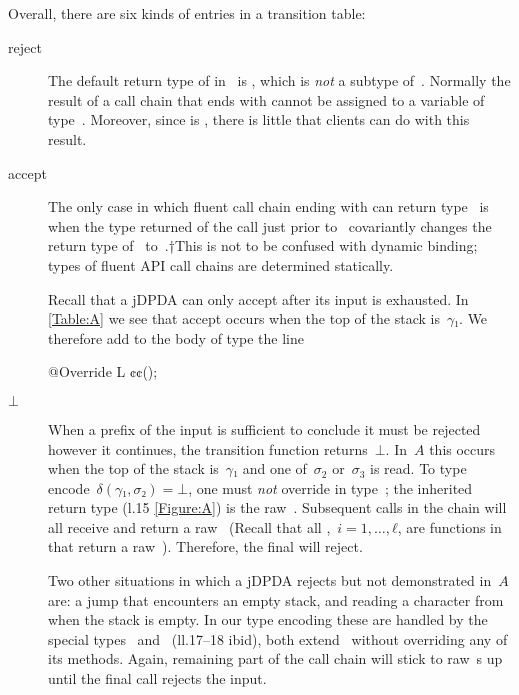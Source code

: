 \documentclass[a4paper,USenglish]{lipics-v2016}
\begin{document}
Overall, there are six kinds of entries in a transition table:
\begin{description}

  \item[\textsf{reject}]
  The default return type of \cc{\$()} in~ is , which
  is \emph{not} a subtype of~. Normally the result of a call chain that ends with \cc{\$()}
  cannot be assigned to a variable of type~. Moreover, since  is ,
  there is little that clients can do with this result.

  \item[\textsf{accept}]
  The only case in which fluent call chain ending with \cc{\$()} can return
    type~ is when the type returned of the call just prior to~ covariantly
    changes the return type of~\cc{\$()} to~.†{This is not to be confused with dynamic binding;
    types of fluent API call chains are determined statically.}
  \par
  Recall that a jDPDA can only accept after its input is exhausted.
  In \cref{Table:A} we see that \textsf{accept} occurs when the top of the stack is~$γ₁$.
  We therefore add to the body of type  the line
  \begin{JAVA}
@Override L ¢\gobble$¢$();
  \end{JAVA}

  \item[$⊥$]
  When a prefix of the input is sufficient to conclude it must be rejected however it continues,
    the transition function returns~$⊥$.
  In~$A$ this occurs when the top of the stack is~$γ₁$ and one of~$σ_2$ or~$σ_3$ is read.
  To type encode~$δ(γ₁,σ₂) =⊥$, one must \emph{not} override  in type~;
    the inherited return type (l.15 \cref{Figure:A}) is the raw~.
  Subsequent calls in the chain will all receive and return a raw~
    (Recall that all ,~$i=1,…,ℓ$, are functions in~ that return a raw~).
  Therefore, the final \cc{\$()} will reject.
  \par
  Two other situations in which a jDPDA rejects but not demonstrated in~$A$ are:
    a \textsf{jump} that encounters an empty stack, and reading a character from when the stack is empty.
  In our type encoding these are handled by the special
    types~ and~ (ll.17--18 ibid), both extend~ without
    overriding any of its methods. Again, remaining part of the call chain will stick to
    raw~s up until the final \cc{\$()} call rejects the input.


\end{description}
\end{document}
